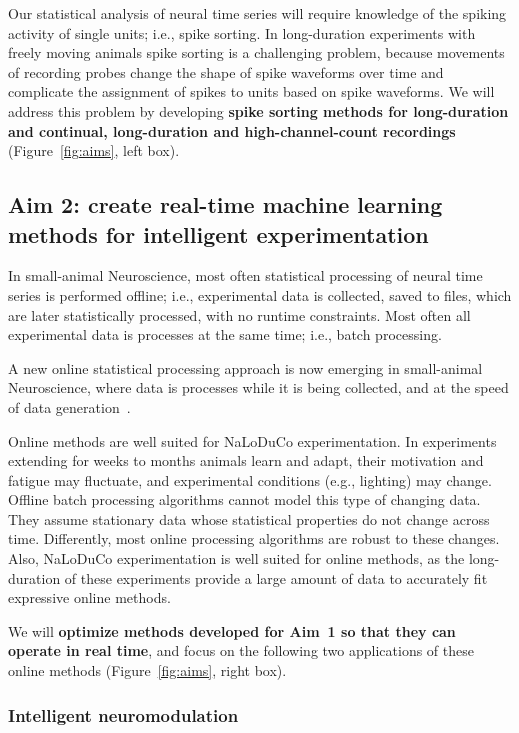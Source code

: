 \documentclass[12pt]{article}
\begin{document}
Our statistical analysis of neural time series will require knowledge of the
spiking activity of single units; i.e., spike sorting. In long-duration
experiments with freely moving animals spike sorting is a challenging problem,
because movements of recording probes change the shape of spike waveforms over
time and complicate the assignment of spikes to units based on spike waveforms.
We will address this problem by developing \textbf{spike sorting methods for
long-duration and continual, long-duration and high-channel-count recordings}
(Figure~\ref{fig:aims}, left box).

\subsection*{Aim 2: create real-time machine learning methods for intelligent
experimentation}

In small-animal Neuroscience, most often statistical processing of neural time series is
performed offline;
i.e., experimental data is collected, saved to files, which are later
statistically processed, with no runtime constraints. Most often all
experimental data is processes at the same time; i.e., batch processing.

A new online statistical processing approach is now emerging in small-animal Neuroscience,
where data is processes while it is being collected, and at the speed of data
generation~\citep{vermaniEtAl24}.

Online methods are well suited for NaLoDuCo experimentation. In experiments
extending for weeks to months animals learn and adapt, their motivation and
fatigue may fluctuate, and experimental conditions (e.g., lighting) may change.
Offline batch processing algorithms cannot model this type of changing data.
They assume stationary data whose statistical properties do not change across
time. Differently, most online processing algorithms are robust to
these changes.
%
Also, NaLoDuCo experimentation is well suited for online methods, as the
long-duration of these experiments provide a large amount of data to accurately
fit expressive online methods.

We will \textbf{optimize methods developed for Aim~1 so that they can operate
in real time}, and focus on the following two applications of these online
methods (Figure~\ref{fig:aims}, right box).

\subsubsection*{Intelligent neuromodulation}
\end{document}
